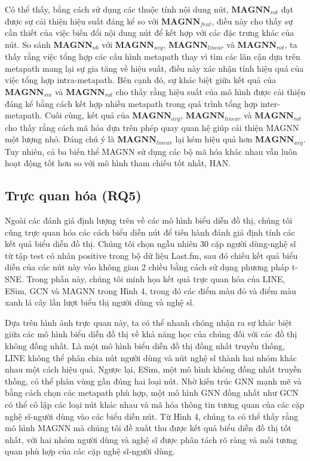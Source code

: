 Có thể thấy, bằng cách sử dụng các thuộc tính nội dung nút, $\mathbf{MAGNN}_{rot}$ đạt được sự cải thiện hiệu suất đáng kể so với $\mathbf{MAGNN}_{feat}$, điều này cho thấy sự cần thiết của việc biến đổi nội dung nút để kết hợp với các đặc trưng khác của nút. So sánh $\mathbf{MAGNN}_{nb}$ với $\mathbf{MAGNN}_{avg}$, $\mathbf{MAGNN}_{linear}$ và $\mathbf{MAGNN}_{rot}$, ta thấy rằng việc tổng hợp các cấu hình metapath thay vì tìm các lân cận dựa trên metapath mang lại sự gia tăng về hiệu suất, điều này xác nhận tính hiệu quả của việc tổng hợp intra-metapath. Bên cạnh đó, sự khác biệt giữa kết quả của $\mathbf{MAGNN}_{sm}$ và $\mathbf{MAGNN}_{rot}$ cho thấy rằng hiệu suất của mô hình được cải thiện đáng kể bằng cách kết hợp nhiều metapath trong quá trình tổng hợp inter-metapath. Cuối cùng, kết quả của $\mathbf{MAGNN}_{avg}$, $\mathbf{MAGNN}_{linear}$ và $\mathbf{MAGNN}_{rot}$ cho thấy rằng cách mã hóa dựa trên phép quay quan hệ giúp cải thiện MAGNN một lượng nhỏ. Đáng chú ý là $\mathbf{MAGNN}_{linear}$ lại kém hiệu quả hơn $\mathbf{MAGNN}_{avg}$. Tuy nhiên, cả ba biến thể MAGNN sử dụng các bộ mã hóa khác nhau vẫn luôn hoạt động tốt hơn so với mô hình tham chiếu tốt nhất, HAN.

\subsection{Trực quan hóa (RQ5)}
Ngoài các đánh giá định lượng trên về các mô hình biểu diễn đồ thị, chúng tôi cũng trực quan hóa các cách biểu diễn nút để tiến hành đánh giá định tính các kết quả biểu diễn đồ thị. Chúng tôi chọn ngẫu nhiên 30 cặp người dùng-nghệ sĩ từ tập test có nhãn positive trong bộ dữ liệu Last.fm, sau đó chiếu kết quả biểu diễn của các nút này vào không gian 2 chiều bằng cách sử dụng phương pháp t-SNE. Trong phần này, chúng tôi minh họa kết quả trực quan hóa của LINE, ESim, GCN và MAGNN trong Hình 4, trong đó các điểm màu đỏ và điểm màu xanh lá cây lần lượt biểu thị người dùng và nghệ sĩ.

Dựa trên hình ảnh trực quan này, ta có thể nhanh chóng nhận ra sự khác biệt giữa các mô hình biểu diễn đồ thị về khả năng học của chúng đối với các đồ thị không đồng nhất. Là một mô hình biểu diễn đồ thị đồng nhất truyền thống, LINE không thể phân chia nút người dùng và nút nghệ sĩ thành hai nhóm khác nhau một cách hiệu quả. Ngược lại, ESim, một mô hình không đồng nhất truyền thống, có thể phân vùng gần đúng hai loại nút. Nhờ kiến trúc GNN mạnh mẽ và bằng cách chọn các metapath phù hợp, một mô hình GNN đồng nhất như GCN có thể cô lập các loại nút khác nhau và mã hóa thông tin tương quan của các cặp nghệ sĩ-người dùng vào các biểu diễn nút. Từ Hình 4, chúng ta có thể thấy rằng mô hình MAGNN mà chúng tôi đề xuất thu được kết quả biểu diễn đồ thị tốt nhất, với hai nhóm người dùng và nghệ sĩ được phân tách rõ ràng và mối tương quan phù hợp của các cặp nghệ sĩ-người dùng.

